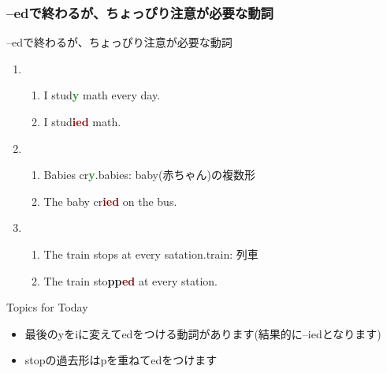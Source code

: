 \documentclass[aspectratio=169,xcolor={dvipsnames,table}]{beamer}
\newcommand{\myaudio}[1]{\href{#1}{\faVolumeUp}}
\begin{document}
\subsubsection{--edで終わるが、ちょっぴり注意が必要な動詞}
\begin{frame}[plain]{--edで終わるが、ちょっぴり注意が必要な動詞}
 
\begin{enumerate}
 \item \begin{enumerate}
	\item I stud\textcolor{ForestGreen}{\bfseries y} math every day.
	\item I stud\textcolor{Maroon}{\bfseries ied} math.
       \end{enumerate}
 \item \begin{enumerate}
	\item Babies cr\textcolor{ForestGreen}{\bfseries y}.\hfill{}{{\small babies: baby(赤ちゃん)の複数形}}
	\item The baby cr\textcolor{Maroon}{\bfseries ied} on the bus.
       \end{enumerate}
 \item \begin{enumerate}
	\item The train stops at every satation.\hfill{}{{\small train: 列車}}
	\item The train sto\textcolor{NavyBlue}{\bfseries pp}\textcolor{Maroon}{\bfseries ed} at every station.
       \end{enumerate}
\end{enumerate}

\begin{exampleblock}{Topics for Today}\small
\begin{itemize}
 \item 最後のyをiに変えてedをつける動詞があります(結果的に--iedとなります)
 \item stopの過去形はpを重ねてedをつけます
\end{itemize}
\end{exampleblock}
\hfill\myaudio{./audio/025_past_do_08.mp3}

\end{frame}
\end{document}
